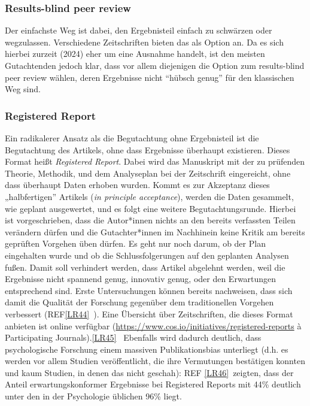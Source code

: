 \documentclass[
  letterpaper,
  DIV=11,
  numbers=noendperiod]{scrreprt}
\begin{document}
\subsubsection{Results-blind peer
review}\label{results-blind-peer-review}

Der einfachste Weg ist dabei, den Ergebnisteil einfach zu schwärzen oder
wegzulassen. Verschiedene Zeitschriften bieten das als Option an. Da es
sich hierbei zurzeit (2024) eher um eine Ausnahme handelt, ist den
meisten Gutachtenden jedoch klar, dass vor allem diejenigen die Option
zum results-blind peer review wählen, deren Ergebnisse nicht ``hübsch
genug'' für den klassischen Weg sind.

\subsubsection{Registered Report}\label{registered-report}

Ein radikalerer Ansatz als die Begutachtung ohne Ergebnisteil ist die
Begutachtung des Artikels, ohne dass Ergebnisse überhaupt existieren.
Dieses Format heißt \emph{Registered Report}. Dabei wird das Manuskript
mit der zu prüfenden Theorie, Methodik, und dem Analyseplan bei der
Zeitschrift eingereicht, ohne dass überhaupt Daten erhoben wurden. Kommt
es zur Akzeptanz dieses „halbfertigen'' Artikels (\emph{in principle
acceptance}), werden die Daten gesammelt, wie geplant ausgewertet, und
es folgt eine weitere Begutachtungsrunde. Hierbei ist vorgeschrieben,
dass die Autor*innen nichts an den bereits verfassten Teilen verändern
dürfen und die Gutachter*innen im Nachhinein keine Kritik am bereits
geprüften Vorgehen üben dürfen. Es geht nur noch darum, ob der Plan
eingehalten wurde und ob die Schlussfolgerungen auf den geplanten
Analysen fußen. Damit soll verhindert werden, dass Artikel abgelehnt
werden, weil die Ergebnisse nicht spannend genug, innovativ genug, oder
den Erwartungen entsprechend sind. Erste Untersuchungen können bereits
nachweisen, dass sich damit die Qualität der Forschung gegenüber dem
traditionellen Vorgehen verbessert
(REF\hyperref[_msocom_44]{{[}LR44{]}}~). Eine Übersicht über
Zeitschriften, die dieses Format anbieten ist online verfügbar
(\url{https://www.cos.io/initiatives/registered-reports} à Participating
Journals).\hyperref[_msocom_45]{{[}LR45{]}}~ Ebenfalls wird dadurch
deutlich, dass psychologische Forschung einem massiven Publikationsbias
unterliegt (d.h. es werden vor allem Studien veröffentlicht, die ihre
Vermutungen bestätigen konnten und kaum Studien, in denen das nicht
geschah): REF \hyperref[_msocom_46]{{[}LR46{]}}~zeigten, dass der Anteil
erwartungskonformer Ergebnisse bei Registered Reports mit 44\% deutlich
unter den in der Psychologie üblichen 96\% liegt.
\end{document}
